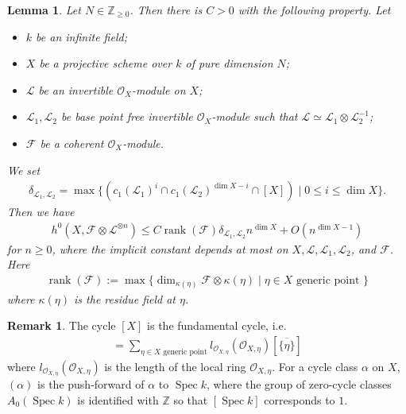 \documentclass[12pt]{amsart}
\theoremstyle{plain}
\newtheorem{lemma}[theorem]{Lemma}
\theoremstyle{definition}
\newtheorem{remark}[theorem]{Remark}
\numberwithin{equation}{section}
\def\Z{{\mathbb Z}}
\def\O{{ \mathcal{O}}}
\def\a{{ \mathfrak{a}}}
\DeclareMathOperator{\rank}{rank}
\DeclareMathOperator{\Spec}{Spec}
\renewcommand{\a}{\alpha}
\renewcommand{\d}{\delta}
\renewcommand{\k}{\kappa}
\begin{document}
\begin{lemma}\label{lem:arr}
Let $N \in \Z_{\geq 0}$.
Then there is $C > 0$ with the following property.
Let 
\begin{itemize}
\item $k$ be an infinite field;
\item $X$ be a projective scheme over $k$ of pure dimension $N$;
\item $ \mathcal{L}$ be an invertible $\O_{X}$-module on $X$;
\item $ \mathcal{L}_{1}, \mathcal{L}_{2}$ be base point free  invertible $\O_{X}$-module such that 
$ \mathcal{L} \simeq \mathcal{L}_{1} \otimes \mathcal{L}_{2}^{-1} $;
\item $ \mathcal{F}$ be a coherent $\O_{X}$-module.
\end{itemize}
We set 
\begin{align}
\d_{ \mathcal{L}_{1}, \mathcal{L}_{2}} = \max\{ (c_{1}( \mathcal{L}_{1})^{i} \cap c_{1}( \mathcal{L}_{2})^{\dim X - i} \cap [X]) \mid 0 \leq i \leq \dim X  \}.
\end{align}
Then we have
\begin{align}
h^{0}(X, \mathcal{F} \otimes \mathcal{L}^{\otimes n}) \leq C \rank(\mathcal{F})\d_{ \mathcal{L}_{1} , \mathcal{L}_{2}}  n^{\dim X} + O(n^{\dim X - 1})
\end{align}
for $n \geq 0$,
where the implicit constant depends at most on $X, \mathcal{L}, \mathcal{L}_{1}, \mathcal{L}_{2}$, and $ \mathcal{F}$.
Here 
\begin{align}
\rank( \mathcal{F}) := \max \{ \dim_{\k(\eta)} \mathcal{F} \otimes \k(\eta) \mid \text{$\eta \in X$ generic point } \}
\end{align}
where $\k(\eta)$ is the residue field at $\eta$.
\end{lemma}

\begin{remark}
The cycle $[X]$ is the fundamental cycle, i.e.
\begin{align}
[X] = \sum_{\text{$\eta \in X$ generic point}} l_{\O_{X,\eta}}(\O_{X,\eta}) [ \overline{\{\eta\}} ]
\end{align}
where $l_{\O_{X,\eta}}(\O_{X,\eta})$ is the length of the local ring $\O_{X,\eta}$.
For a cycle class $\a$ on $X$, $(\a)$ is the push-forward of $\a$ to $\Spec k$, where
the group of zero-cycle classes $A_{0}(\Spec k)$ is identified with $\Z$ so that $[\Spec k]$ corresponds to $1$.
\end{remark}
\end{document}
